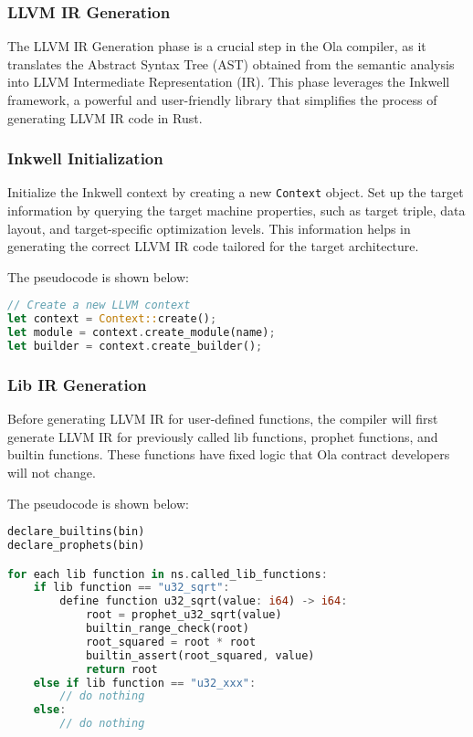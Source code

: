 \subsubsection{LLVM IR Generation}

The LLVM IR Generation phase is a crucial step in the Ola compiler, as it translates the Abstract Syntax Tree (AST) obtained from the semantic analysis into LLVM Intermediate Representation (IR). This phase leverages the Inkwell framework, a powerful and user-friendly library that simplifies the process of generating LLVM IR code in Rust.

\subsubsection*{Inkwell Initialization}

Initialize the Inkwell context by creating a new \texttt{Context} object. Set up the target information by querying the target machine properties, such as target triple, data layout, and target-specific optimization levels. This information helps in generating the correct LLVM IR code tailored for the target architecture.

The pseudocode is shown below:

\begin{lstlisting}[language=Rust]
// Create a new LLVM context
let context = Context::create();
let module = context.create_module(name);
let builder = context.create_builder();
\end{lstlisting}
\subsubsection*{Lib IR Generation}

Before generating LLVM IR for user-defined functions, the compiler will first generate LLVM IR for previously called lib functions, prophet functions, and builtin functions. These functions have fixed logic that Ola contract developers will not change.

The pseudocode is shown below:

\begin{lstlisting}[language=Rust]
declare_builtins(bin)
declare_prophets(bin)

for each lib function in ns.called_lib_functions:
    if lib function == "u32_sqrt":
        define function u32_sqrt(value: i64) -> i64:
            root = prophet_u32_sqrt(value)
            builtin_range_check(root)
            root_squared = root * root
            builtin_assert(root_squared, value)
            return root
    else if lib function == "u32_xxx":
        // do nothing
    else:
        // do nothing
\end{lstlisting}
